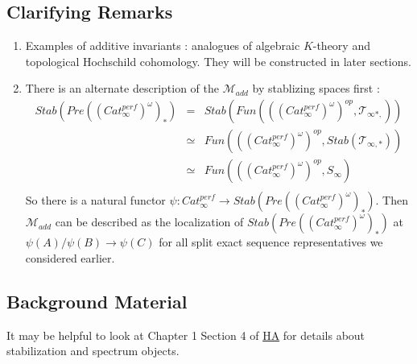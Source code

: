 \documentclass[letterpaper]{article}
\theoremstyle{definition}
\begin{document}
\subsection{Clarifying Remarks}

\begin{enumerate}
\item Examples of additive invariants : analogues of algebraic $K$-theory and topological Hochschild cohomology. They will be constructed in later sections. 
\item There is an alternate description of the $\mathcal{M}_{add}$ by stablizing spaces first :
\begin{eqnarray*}
Stab(Pre((Cat_\infty^{perf})^\omega)_*) & = & Stab(Fun(((Cat_\infty^{perf})^{\omega})^{op}, \mathcal{T}_{\infty*,}))\\
& \simeq & Fun(((Cat_\infty^{perf})^{\omega})^{op}, Stab(\mathcal{T}_{\infty,*}))\\
& \simeq & Fun(((Cat_\infty^{perf})^{\omega})^{op}, S_\infty)\\
\end{eqnarray*}
So there is a natural functor $\psi : Cat_\infty^{perf} \rightarrow Stab(Pre((Cat_\infty^{perf})^\omega)_*)$. Then $\mathcal{M}_{add}$ can be described as the localization of $Stab(Pre((Cat_\infty^{perf})^\omega)_*)$ at $\psi(A)/\psi(B) \rightarrow \psi(C)$ for all split exact sequence representatives we considered earlier. 
\end{enumerate}

\subsection{Background Material}

It may be helpful to look at Chapter 1 Section 4 of \href{References/LurieHigherAlgebra.pdf}{HA} for details about stabilization and spectrum objects. 
\end{document}
